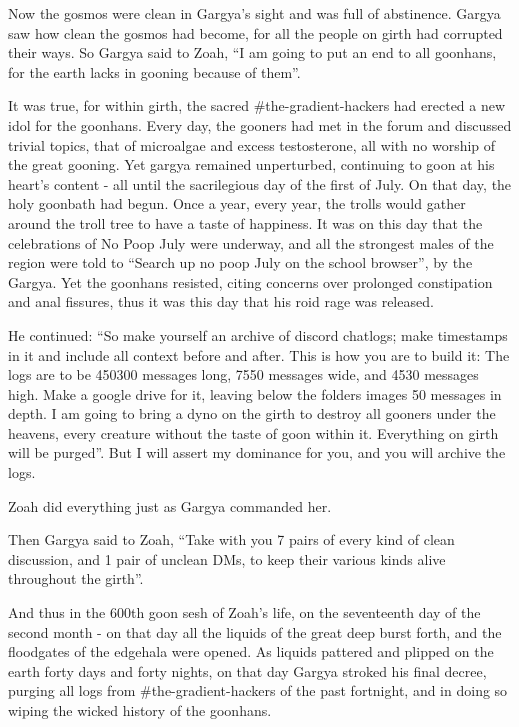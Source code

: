 \documentclass{article}
\begin{document}
Now the gosmos were clean in Gargya's sight and was full of abstinence. Gargya saw how clean the gosmos had become, for all the people on girth had corrupted their ways. So Gargya said to Zoah, “I am going to put an end to all goonhans, for the earth lacks in gooning because of them”. 

It was true, for within girth, the sacred \#the-gradient-hackers had erected a new idol for the goonhans. Every day, the gooners had met in the forum and discussed trivial topics, that of microalgae and excess testosterone, all with no worship of the great gooning. Yet gargya remained unperturbed, continuing to goon at his heart's content - all until the sacrilegious day of the first of July. On that day, the holy goonbath had begun. Once a year, every year, the trolls would gather around the troll tree to have a taste of happiness. It was on this day that the celebrations of No Poop July were underway, and all the strongest males of the region were told to “Search up no poop July on the school browser”, by the Gargya. Yet the goonhans resisted, citing concerns over prolonged constipation and anal fissures, thus it was this day that his roid rage was released.

He continued: “So make yourself an archive of discord chatlogs; make timestamps in it and include all context before and after. This is how you are to build it: The logs are to be 450300 messages long, 7550 messages wide, and 4530 messages high. Make a google drive for it, leaving below the folders images 50 messages in depth. I am going to bring a dyno on the girth to destroy all gooners under the heavens, every creature without the taste of goon within it. Everything on girth will be purged”. But I will assert my dominance for you, and you will archive the logs.

Zoah did everything just as Gargya commanded her.

Then Gargya said to Zoah, “Take with you 7 pairs of every kind of clean discussion, and 1 pair of unclean DMs, to keep their various kinds alive throughout the girth”. 

And thus in the 600th goon sesh of Zoah's life, on the seventeenth day of the second month - on that day all the liquids of the great deep burst forth, and the floodgates of the edgehala were opened. As liquids pattered and plipped on the earth forty days and forty nights, on that day Gargya stroked his final decree, purging all logs from \#the-gradient-hackers of the past fortnight, and in doing so wiping the wicked history of the goonhans.
\end{document}
